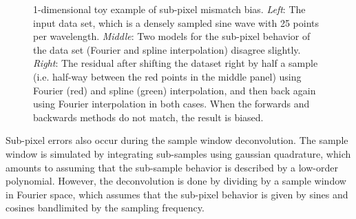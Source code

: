 \documentclass{article}
\begin{document}
\begin{figure}[h!]
\begin{tabular}{m{59mm}m{59mm}m{59mm}}
	\end{tabular}
	\caption{1-dimensional toy example of sub-pixel mismatch bias.
	\emph{Left}: The input data set, which is a densely sampled sine wave with
	25 points per wavelength. \emph{Middle}: Two models for the sub-pixel behavior
	of the data set (Fourier and spline interpolation) disagree slightly.
	\emph{Right}: The residual after shifting the dataset right by half a sample
	(i.e. half-way between the red points in the middle panel) using Fourier
	(red) and spline (green) interpolation, and then back again using Fourier interpolation
	in both cases. When the forwards and backwards methods do not match, the result is biased.}
	\label{fig:iptoy}
\end{figure}

Sub-pixel errors also occur during the sample window deconvolution.
The sample window is simulated by integrating sub-samples using
gaussian quadrature, which amounts to assuming that the sub-sample
behavior is described by a low-order polynomial. However, the
deconvolution is done by dividing by a sample window in Fourier space,
which assumes that the sub-pixel behavior is given by sines and
cosines bandlimited by the sampling frequency.
\end{document}
